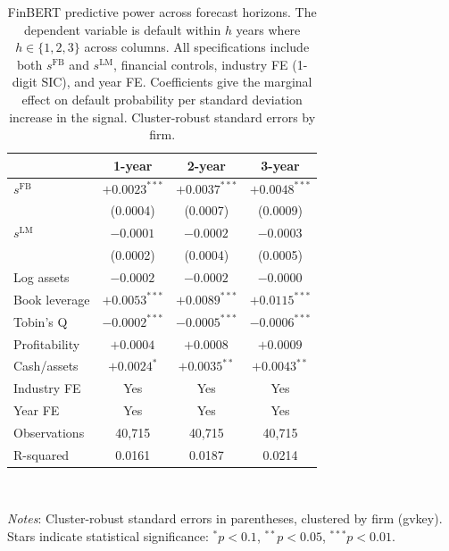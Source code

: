 \begin{table}[htbp]
\centering
\caption{FinBERT predictive power across forecast horizons. The dependent variable is default within $h$ years where $h \in \{1, 2, 3\}$ across columns. All specifications include both $s^{\mathrm{FB}}$ and $s^{\mathrm{LM}}$, financial controls, industry FE (1-digit SIC), and year FE. Coefficients give the marginal effect on default probability per standard deviation increase in the signal. Cluster-robust standard errors by firm.}
\label{tab:t4_horizons}
\small
\begin{tabular}{lccc}
\toprule
 & 1-year & 2-year & 3-year \\
\midrule
$s^{\mathrm{FB}}$ & $+0.0023^{***}$ & $+0.0037^{***}$ & $+0.0048^{***}$ \\
 & (0.0004) & (0.0007) & (0.0009) \\
$s^{\mathrm{LM}}$ & $-0.0001^{}$ & $-0.0002^{}$ & $-0.0003^{}$ \\
 & (0.0002) & (0.0004) & (0.0005) \\
\midrule
Log assets & $-0.0002^{}$ & $-0.0002^{}$ & $-0.0000^{}$ \\
Book leverage & $+0.0053^{***}$ & $+0.0089^{***}$ & $+0.0115^{***}$ \\
Tobin's Q & $-0.0002^{***}$ & $-0.0005^{***}$ & $-0.0006^{***}$ \\
Profitability & $+0.0004^{}$ & $+0.0008^{}$ & $+0.0009^{}$ \\
Cash/assets & $+0.0024^{*}$ & $+0.0035^{**}$ & $+0.0043^{**}$ \\
\midrule
Industry FE & Yes & Yes & Yes \\
Year FE & Yes & Yes & Yes \\
\midrule
Observations & 40,715 & 40,715 & 40,715 \\
R-squared & 0.0161 & 0.0187 & 0.0214 \\
\bottomrule
\end{tabular}
\\[-2ex]
\begin{flushleft}
\footnotesize
\textit{Notes}: Cluster-robust standard errors in parentheses, clustered by firm (gvkey). Stars indicate statistical significance: $^{*}p<0.1$, $^{**}p<0.05$, $^{***}p<0.01$.
\end{flushleft}
\end{table}
